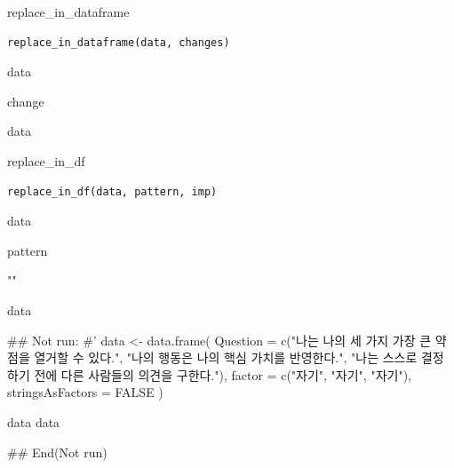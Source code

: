 \documentclass[a4paper]{book}
\begin{document}
%
\begin{Description}
replace\_in\_dataframe
\end{Description}
%
\begin{Usage}
\begin{verbatim}
replace_in_dataframe(data, changes)
\end{verbatim}
\end{Usage}
%
\begin{Arguments}
\begin{ldescription}
\item[\code{data}] data

\item[\code{changes}] change
\end{ldescription}
\end{Arguments}
%
\begin{Value}
data
\end{Value}

%
\begin{Description}
replace\_in\_df
\end{Description}
%
\begin{Usage}
\begin{verbatim}
replace_in_df(data, pattern, imp)
\end{verbatim}
\end{Usage}
%
\begin{Arguments}
\begin{ldescription}
\item[\code{data}] data

\item[\code{pattern}] pattern

\item[\code{imp}] ""
\end{ldescription}
\end{Arguments}
%
\begin{Value}
data
\end{Value}
%
\begin{Examples}
\begin{ExampleCode}
\#\# Not run: 
#'
data <- data.frame(
  Question = c("나는 나의 세 가지 가장 큰
  약점을 열거할 수 있다.", "나의 행동은 나의
  핵심 가치를 반영한다.", "나는 스스로 결정하기
  전에 다른 사람들의 의견을 구한다."),
  factor = c("자기", "자기", "자기"),
  stringsAsFactors = FALSE
)

data
data %

## End(Not run)
\end{ExampleCode}
\end{Examples}
\end{document}
